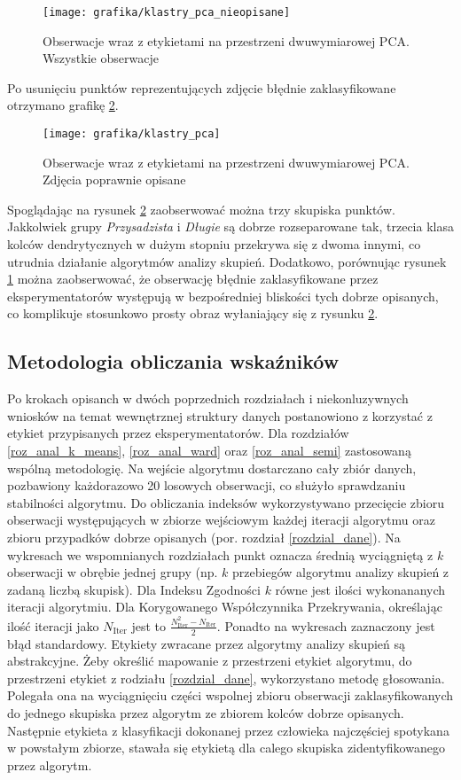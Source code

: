 \documentclass{article}
\begin{document}
\begin{figure}
\texttt{[image: grafika/klastry\_pca\_nieopisane]}
\caption{Obserwacje wraz z etykietami na przestrzeni dwuwymiarowej PCA. Wszystkie obserwacje}
\label{pca_nieopisane}
\end{figure}

Po usunięciu punktów reprezentujących zdjęcie błędnie zaklasyfikowane otrzymano grafikę \ref{pca_opisane}.
\begin{figure}
\texttt{[image: grafika/klastry\_pca]}
\caption{Obserwacje wraz z etykietami na przestrzeni dwuwymiarowej PCA. Zdjęcia poprawnie opisane}
\label{pca_opisane}

\end{figure}

Spoglądając na rysunek \ref{pca_opisane} zaobserwować można trzy skupiska punktów. Jakkolwiek grupy \textit{Przysadzista} i \textit{Długie} są dobrze rozseparowane tak, trzecia klasa kolców dendrytycznych w dużym stopniu przekrywa się z dwoma innymi, co utrudnia działanie algorytmów analizy skupień.
Dodatkowo, porównując rysunek \ref{pca_nieopisane} można zaobserwować, że obserwację błędnie zaklasyfikowane przez eksperymentatorów występują w bezpośredniej bliskości tych dobrze opisanych, co komplikuje stosunkowo prosty obraz wyłaniający się z rysunku \ref{pca_opisane}.
\FloatBarrier
\subsection{Metodologia obliczania wskaźników}
\label{rozMetodologiaWskaznikow}
Po krokach opisanch w dwóch poprzednich rozdziałach i niekonluzywnych wniosków na temat wewnętrznej struktury danych postanowiono z korzystać z etykiet przypisanych przez eksperymentatorów.
Dla rozdziałów \ref{roz_anal_k_means}, \ref{roz_anal_ward} oraz \ref{roz_anal_semi} zastosowaną wspólną metodologię.
Na wejście algorytmu dostarczano cały zbiór danych, pozbawiony każdorazowo 20 losowych obserwacji, co służyło sprawdzaniu stabilności algorytmu. 
Do obliczania indeksów wykorzystywano przecięcie zbioru obserwacji występujących w zbiorze wejściowym każdej iteracji algorytmu oraz zbioru przypadków dobrze opisanych (por. rozdział \ref{rozdzial_dane}).
Na wykresach we wspomnianych rozdziałach punkt oznacza średnią wyciągniętą z $k$ obserwacji w obrębie jednej grupy (np. $k$ przebiegów algorytmu analizy skupień z zadaną liczbą skupisk).
Dla Indeksu Zgodności $k$ równe jest ilości wykonananych iteracji algorytmiu.
Dla Korygowanego Współczynnika Przekrywania, określając ilość iteracji jako $N_{\text{Iter}}$ jest to $\frac{N_\text{Iter}^2 - N_\text{Iter}}{2}$.
Ponadto na wykresach zaznaczony jest błąd standardowy.
Etykiety zwracane przez algorytmy analizy skupień są abstrakcyjne.
Żeby określić mapowanie z przestrzeni etykiet algorytmu, do przestrzeni etykiet z rodziału \ref{rozdzial_dane}, wykorzystano metodę głosowania.
Polegała ona na wyciągnięciu części wspolnej zbioru obserwacji zaklasyfikowanych do jednego skupiska przez algorytm ze zbiorem kolców dobrze opisanych.
Następnie etykieta z klasyfikacji dokonanej przez człowieka najczęściej spotykana w powstałym zbiorze, stawała się etykietą dla calego skupiska zidentyfikowanego przez algorytm.
\end{document}
